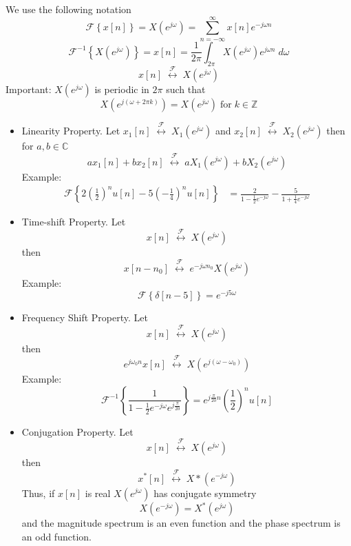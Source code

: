 We use the following notation
\[
\mathcal{F}\left\{ x[n] \right\} = X\left(e^{j\omega}\right) = \sum\limits_{n = -\infty}^{\infty} x[n] e^{-j\omega n}
\]
\[
\mathcal{F}^{-1}\left\{ X\left(e^{j\omega}\right) \right\} = x[n] =  \frac{1}{2\pi} \int_{2\pi} X\left(e^{j\omega}\right) e^{j\omega n} \; d\omega 
\]
\[
x[n] \; \stackrel{\mathcal{F}}{\longleftrightarrow} \;  X\left(e^{j\omega}\right)
\]
Important: $X\left(e^{j\omega}\right)$ is periodic in $2\pi$ such that
\[
X\left(e^{j(\omega + 2\pi k)}\right) =  X\left(e^{j\omega}\right) \;\text{for}\; k \in \mathbb{Z}
\]
\begin{itemize}
  \item Linearity Property.
  Let $x_1[n] \; \stackrel{\mathcal{F}}{\longleftrightarrow} \; X_1\left(e^{j\omega}\right)$ and $x_2[n] \; \stackrel{\mathcal{F}}{\longleftrightarrow} \; X_2\left(e^{j\omega}\right)$
  then for $a,b\in\mathbb{C}$
  \[
a x_1[n] + b x_2[n] \; \stackrel{\mathcal{F}}{\longleftrightarrow} \; a X_1\left(e^{j\omega}\right) + b X_2\left(e^{j\omega}\right)
\]
Example:
\begin{align*}
\mathcal{F}\left\{ 2\left( \frac{1}{2}\right)^nu[n] -5 \left( -\frac{1}{4}\right)^nu[n] \right\} &= \frac{2}{1-\frac{1}{2}e^{-j\omega}} - \frac{5}{1+\frac{1}{4}e^{-j\omega}} 
\end{align*}
\item Time-shift Property.
  Let
  \[
  x[n] \; \stackrel{\mathcal{F}}{\longleftrightarrow} \; X\left(e^{j\omega}\right)
  \]
  then
  \[
  x[n-n_0] \; \stackrel{\mathcal{F}}{\longleftrightarrow} \; e^{-j\omega n_0} X\left(e^{j\omega}\right)
  \]
  Example:
  \[
  \mathcal{F}\left\{ \delta[n-5] \right\} = e^{-j5\omega}
  \]
\item Frequency Shift Property.
  Let
  \[
  x[n] \; \stackrel{\mathcal{F}}{\longleftrightarrow} \; X\left(e^{j\omega}\right)
  \]
  then
  \[
  e^{j\omega_0 n} x[n] \; \stackrel{\mathcal{F}}{\longleftrightarrow} \; X\left(e^{j(\omega-\omega_0)}\right)
  \]
  Example:
  \[
  \mathcal{F}^{-1}\left\{ \frac{1}{1-\frac{1}{2}e^{-j\omega}e^{j\frac{\pi}{20}}} \right\} = e^{j\frac{\pi}{20} n} \left( \frac{1}{2}\right)^n u[n]
  \]
\item Conjugation Property.
  Let
  \[
  x[n] \; \stackrel{\mathcal{F}}{\longleftrightarrow} \; X\left(e^{j\omega}\right)
  \]
  then
  \[
  x^*[n] \; \stackrel{\mathcal{F}}{\longleftrightarrow} \; X*\left(e^{-j\omega}\right)
  \]
  Thus, if $x[n]$ is real $X\left(e^{j\omega}\right)$ has conjugate symmetry
  \[
  X\left(e^{-j\omega}\right) = X^*\left(e^{j\omega}\right)
  \]
  and the magnitude spectrum is an even function and the phase spectrum is an odd function.

\end{itemize}
